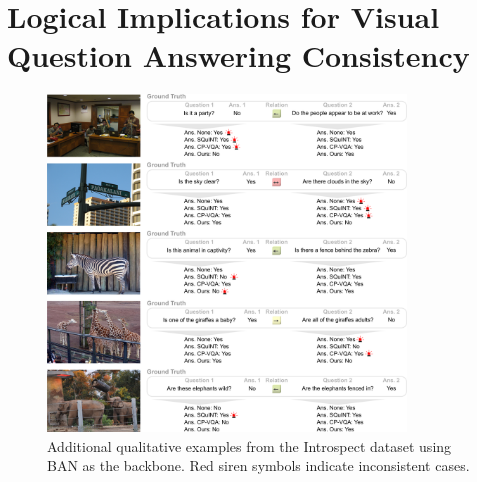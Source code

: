 \chapter{Logical Implications for Visual Question Answering Consistency}
\label{appendix:consistency_logic}

\begin{figure}[!b]
\centering
\includegraphics[width=0.85\textwidth]{Figures/Part2_Consist/02_logic/examples_ban_supplementary1.pdf}
\caption{Additional qualitative examples from the Introspect dataset using BAN as the backbone. Red siren symbols indicate inconsistent cases. }
\label{fig:examples_introspect1}
\end{figure}

